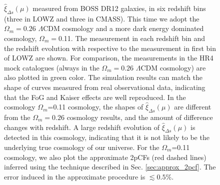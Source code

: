 \documentclass[iop]{emulateapj}
\begin{document}
\begin{figure}
   \caption{\label{fig_xi}
   $\hat\xi_{\Delta s}(\mu)$ measured from BOSS DR12 galaxies, in six redshift bins (three in LOWZ and three in CMASS).
   This time we adopt the $\Omega_m=0.26$ $\Lambda$CDM cosmology and a more dark energy dominated cosmology, $\Omega_m=$0.11.
   The measurement in each redshift bin and the redshift evolution with respective to the measurement in first bin of LOWZ are shown.
   For comparison, the measurements in the HR4 mock catalogues (always in the $\Omega_m=0.26$ $\Lambda$CDM cosmology) are also plotted in green color.
   The simulation results can match the shape of curves measured from real observational data, 
   indicating that the FoG and Kaiser effects are well reproduced.
   In the cosmology $\Omega_m$=0.11 cosmology, the shapes of $\hat\xi_{\Delta s}(\mu)$ are different from the $\Omega_m=0.26$ cosmology results,
   and the amount of difference changes with redshift.
   A large redshift evolution of $\hat\xi_{\Delta s}(\mu)$ is detected in this cosmology, 
   indicating that it is not likely to be the underlying true cosmology of our universe.
   For the $\Omega_m$=0.11 cosmology, we also plot the approximate 2pCFs (red dashed lines) 
     inferred using the technique described in Sec. \ref{sec:approx_2pcf}.
   The error induced in the approximate procedure is $\lesssim0.5\%$.
   }
\end{figure}
\end{document}
